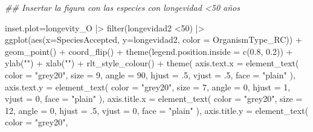 \documentclass[
  12pt,
  letterpaper,
]{book}
\newenvironment{Shaded}{\begin{snugshade}}{\end{snugshade}}
\newcommand{\AttributeTok}[1]{\textcolor[rgb]{0.40,0.45,0.13}{#1}}
\newcommand{\DecValTok}[1]{\textcolor[rgb]{0.68,0.00,0.00}{#1}}
\newcommand{\DocumentationTok}[1]{\textcolor[rgb]{0.37,0.37,0.37}{\textit{#1}}}
\newcommand{\FloatTok}[1]{\textcolor[rgb]{0.68,0.00,0.00}{#1}}
\newcommand{\FunctionTok}[1]{\textcolor[rgb]{0.28,0.35,0.67}{#1}}
\newcommand{\NormalTok}[1]{\textcolor[rgb]{0.00,0.23,0.31}{#1}}
\newcommand{\OtherTok}[1]{\textcolor[rgb]{0.00,0.23,0.31}{#1}}
\newcommand{\SpecialCharTok}[1]{\textcolor[rgb]{0.37,0.37,0.37}{#1}}
\newcommand{\StringTok}[1]{\textcolor[rgb]{0.13,0.47,0.30}{#1}}
\begin{document}
\begin{Shaded}
\begin{Highlighting}[]
\DocumentationTok{\#\# Insertar la figura con las especies con longevidad \textless{}50 años}

\NormalTok{inset.plot}\OtherTok{=}\NormalTok{longevity\_O }\SpecialCharTok{|\textgreater{}} 
  \FunctionTok{filter}\NormalTok{(longevidad2 }\SpecialCharTok{\textless{}}\DecValTok{50}\NormalTok{) }\SpecialCharTok{|\textgreater{}} 
\FunctionTok{ggplot}\NormalTok{(}\FunctionTok{aes}\NormalTok{(}\AttributeTok{x=}\NormalTok{SpeciesAccepted, }\AttributeTok{y=}\NormalTok{longevidad2, }\AttributeTok{color =}\NormalTok{ OrganismType\_RC)) }\SpecialCharTok{+}
  \FunctionTok{geom\_point}\NormalTok{() }\SpecialCharTok{+}
  \FunctionTok{coord\_flip}\NormalTok{() }\SpecialCharTok{+}
  \FunctionTok{theme}\NormalTok{(}\AttributeTok{legend.position.inside =} \FunctionTok{c}\NormalTok{(}\FloatTok{0.8}\NormalTok{, }\FloatTok{0.2}\NormalTok{)) }\SpecialCharTok{+}
  \FunctionTok{ylab}\NormalTok{(}\StringTok{""}\NormalTok{) }\SpecialCharTok{+}
  \FunctionTok{xlab}\NormalTok{(}\StringTok{""}\NormalTok{) }\SpecialCharTok{+}
  \FunctionTok{rlt\_style\_colour}\NormalTok{() }\SpecialCharTok{+}
  \FunctionTok{theme}\NormalTok{(}
    \AttributeTok{axis.text.x =} \FunctionTok{element\_text}\NormalTok{(}
      \AttributeTok{color =} \StringTok{"grey20"}\NormalTok{,}
      \AttributeTok{size =} \DecValTok{9}\NormalTok{,}
      \AttributeTok{angle =} \DecValTok{90}\NormalTok{,}
      \AttributeTok{hjust =}\NormalTok{ .}\DecValTok{5}\NormalTok{,}
      \AttributeTok{vjust =}\NormalTok{ .}\DecValTok{5}\NormalTok{,}
      \AttributeTok{face =} \StringTok{"plain"}
\NormalTok{    ),}
    \AttributeTok{axis.text.y =} \FunctionTok{element\_text}\NormalTok{(}
      \AttributeTok{color =} \StringTok{"grey20"}\NormalTok{,}
      \AttributeTok{size =} \DecValTok{7}\NormalTok{,}
      \AttributeTok{angle =} \DecValTok{0}\NormalTok{,}
      \AttributeTok{hjust =} \DecValTok{1}\NormalTok{,}
      \AttributeTok{vjust =} \DecValTok{0}\NormalTok{,}
      \AttributeTok{face =} \StringTok{"plain"}
\NormalTok{    ),}
    \AttributeTok{axis.title.x =} \FunctionTok{element\_text}\NormalTok{(}
      \AttributeTok{color =} \StringTok{"grey20"}\NormalTok{,}
      \AttributeTok{size =} \DecValTok{12}\NormalTok{,}
      \AttributeTok{angle =} \DecValTok{0}\NormalTok{,}
      \AttributeTok{hjust =}\NormalTok{ .}\DecValTok{5}\NormalTok{,}
      \AttributeTok{vjust =} \DecValTok{0}\NormalTok{,}
      \AttributeTok{face =} \StringTok{"plain"}
\NormalTok{    ),}
    \AttributeTok{axis.title.y =} \FunctionTok{element\_text}\NormalTok{(}
      \AttributeTok{color =} \StringTok{"grey20"}\NormalTok{,}

\end{Highlighting}
\end{Shaded}
\end{document}
